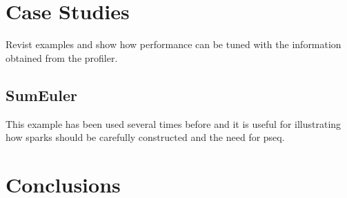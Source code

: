 \documentclass[twocolumn,9pt]{sigplanconf}
\begin{document}
\section{Case Studies}
Revist examples and show how performance can be tuned with the information obtained from the profiler.

\subsection{SumEuler}
This example has been used several times before and it is useful for illustrating how sparks should be carefully constructed and the need for pseq.



\section{Conclusions}



\end{document}
